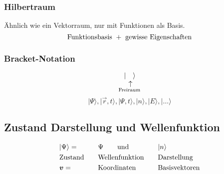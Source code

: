 \subsubsection{Hilbertraum}

Ähnlich wie ein Vektorraum, nur mit Funktionen als Basis.
\begin{equation*}
\textrm{Funktionsbasis } + \textrm{ gewisse Eigenschaften}
\end{equation*}

\subsubsection{Bracket-Notation}

\begin{equation*}
|\custo{\leftarrow}{\quad}{\mathclap{\tx{Freiraum}}} \rangle
\end{equation*}
\begin{equation*}
|\Psi\rangle , |\vec{r}, t \rangle , | \Psi, t \rangle , | n \rangle , | E \rangle , | \dots \rangle
\end{equation*}

\subsection{Zustand Darstellung und Wellenfunktion}

\begin{alignat*}{3}
&|\Psi\rangle = &&\Psi \qquad \textrm{und} &&| n\rangle\\
&\textrm{Zustand}\quad &&\textrm{Wellenfunktion}\quad &&\textrm{Darstellung}\\
&\bm{v} = &&\textrm{Koordinaten} &&\textrm{Basisvektoren}
\end{alignat*}

